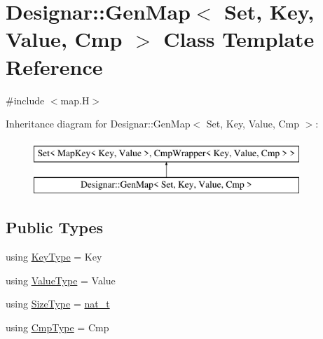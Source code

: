 \hypertarget{class_designar_1_1_gen_map}{}\section{Designar\+:\+:Gen\+Map$<$ Set, Key, Value, Cmp $>$ Class Template Reference}
\label{class_designar_1_1_gen_map}


{\ttfamily \#include $<$map.\+H$>$}

Inheritance diagram for Designar\+:\+:Gen\+Map$<$ Set, Key, Value, Cmp $>$\+:\begin{figure}[H]
\begin{center}
\leavevmode
\includegraphics[height=2.000000cm]{class_designar_1_1_gen_map}
\end{center}
\end{figure}
\subsection*{Public Types}
\begin{DoxyCompactItemize}
\item 
using \hyperlink{class_designar_1_1_gen_map_aeb697a86f4ad13eadc36bf5cc967f26f}{Key\+Type} = Key
\item 
using \hyperlink{class_designar_1_1_gen_map_a525bf32010df09e293fa7a0db5a2a8ef}{Value\+Type} = Value
\item 
using \hyperlink{class_designar_1_1_gen_map_ad7fadcebeec688bb447f63c4bfabc61c}{Size\+Type} = \hyperlink{namespace_designar_aa72662848b9f4815e7bf31a7cf3e33d1}{nat\+\_\+t}
\item 
using \hyperlink{class_designar_1_1_gen_map_ac80521be38e4e808bcbeb7041da7d813}{Cmp\+Type} = Cmp
\end{DoxyCompactItemize}
